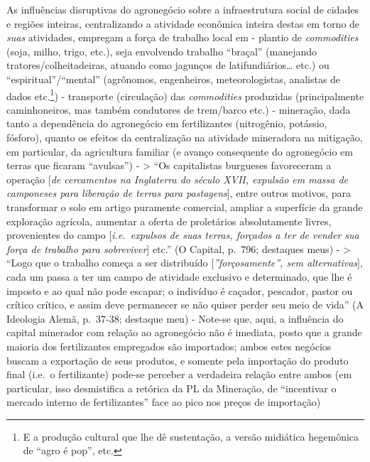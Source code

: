 As influências disruptivas do agronegócio sobre a infraestrutura social
de cidades e regiões inteiras, centralizando a atividade econômica
inteira destas em torno de \textit{suas} atividades, empregam a força de
trabalho local em - plantio de \textit{commodities} (soja, milho, trigo,
etc.), seja envolvendo trabalho ``braçal'' (manejando
tratores/colheitadeiras, atuando como jagunços de latifundiários\ldots{}
etc.) ou ``espiritual''/``mental'' (agrônomos, engenheiros,
meteorologistas, analistas de dados etc.\footnote{E a produção cultural
  que lhe dê sustentação, a versão midiática hegemônica de ``agro é
  pop'', etc.}) - transporte (circulação) das \textit{commodities}
produzidas (principalmente caminhoneiros, mas também condutores de
trem/barco etc.) - mineração, dada tanto a dependência do agronegócio em
fertilizantes (nitrogênio, potássio, fósforo), quanto os efeitos da
centralização na atividade mineradora na mitigação, em particular, da
agricultura familiar (e avanço consequente do agronegócio em terras que
ficaram ``avulsas'') - \textgreater{} ``Os capitalistas burgueses
favoreceram a operação
{[}\textit{de cercamentos na Inglaterra do século XVII, expulsão em massa de camponeses para liberação de terras para pastagens}{]},
entre outros motivos, para transformar o solo em artigo puramente
comercial, ampliar a superfície da grande exploração agrícola, aumentar
a oferta de proletários absolutamente livres, provenientes do campo
{[}\textit{i.e. expulsos de suas terras, forçados a ter de vender sua força de trabalho para sobreviver}{]}
etc.'' (O Capital, p.~796; destaques meus) - \textgreater{} ``Logo que o
trabalho começa a ser distribuído
{[}\textit{”forçosamente”, sem alternativas}{]}, cada um passa a ter um
campo de atividade exclusivo e determinado, que lhe é imposto e ao qual
não pode escapar; o indivíduo é caçador, pescador, pastor ou crítico
crítico, e assim deve permanecer se não quiser perder seu meio de vida''
(A Ideologia Alemã, p.~37-38; destaque meu) - Note-se que, aqui, a
influência do capital minerador com relação ao agronegócio não é
imediata, posto que a grande maioria dos fertilizantes empregados são
importados; ambos estes negócios buscam a exportação de seus produtos, e
somente pela importação do produto final (i.e.~o fertilizante) pode-se
perceber a verdadeira relação entre ambos (em particular, isso
desmistifica a retórica da PL da Mineração, de ``incentivar o mercado
interno de fertilizantes'' face ao pico nos preços de importação)

